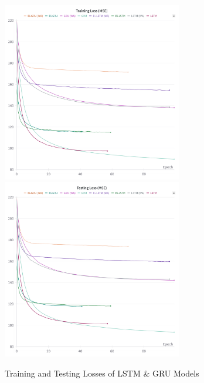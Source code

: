 \begin{figure}[p]
    \centering
    \begin{minipage}{\textwidth}
        \centering
        \includegraphics[width=0.7\textwidth]{images/results/training_loss_mse}
        \vspace{0.001cm}
        \includegraphics[width=0.7\textwidth]{images/results/testing_loss_mse}
        \captionsetup{format=plain, justification=centering, font=small}
        \caption{Training and Testing Losses of LSTM \& GRU Models}
        \label{fig:train_test_mse}
    \end{minipage}
\end{figure}

\newpage